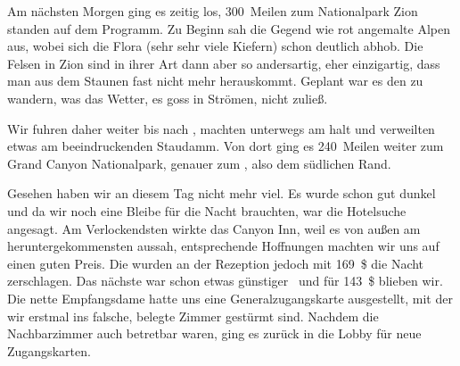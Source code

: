 Am nächsten Morgen ging es zeitig los, 300~Meilen zum Nationalpark Zion standen auf dem Programm.
Zu Beginn sah die Gegend wie rot angemalte Alpen aus, wobei sich die Flora (sehr sehr viele Kiefern) schon deutlich abhob.
Die Felsen in Zion sind in ihrer Art dann aber so andersartig, eher einzigartig, dass man aus dem Staunen fast nicht mehr herauskommt.
Geplant war es den  zu wandern, was das Wetter, es goss in Strömen, nicht zuließ.

Wir fuhren daher weiter bis nach , machten unterwegs am  halt und verweilten etwas am beeindruckenden  Staudamm.
Von dort ging es 240~Meilen weiter zum Grand Canyon Nationalpark, genauer zum , also dem südlichen Rand.

Gesehen haben wir an diesem Tag nicht mehr viel.
Es wurde schon gut dunkel und da wir noch eine Bleibe für die Nacht brauchten, war die Hotelsuche angesagt.
Am Verlockendsten wirkte das Canyon Inn, weil es von außen am heruntergekommensten aussah, entsprechende Hoffnungen machten wir uns auf einen guten Preis.
Die wurden an der Rezeption jedoch mit 169~\$ die Nacht zerschlagen.
Das nächste war schon etwas \glqq günstiger \grqq\, und für 143~\$ blieben wir.
Die nette Empfangsdame hatte uns eine Generalzugangskarte ausgestellt, mit der wir erstmal ins falsche, belegte Zimmer gestürmt sind.
Nachdem die Nachbarzimmer auch betretbar waren, ging es zurück in die Lobby für neue Zugangskarten.
